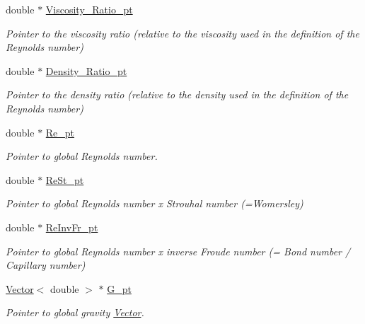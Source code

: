 \begin{DoxyCompactItemize}
\item 
double $\ast$ \hyperlink{classoomph_1_1GeneralisedNewtonianNavierStokesEquations_a14a357f03b102d42fc0e6eb7b539a504}{Viscosity\+\_\+\+Ratio\+\_\+pt}
\begin{DoxyCompactList}\small\item\em Pointer to the viscosity ratio (relative to the viscosity used in the definition of the Reynolds number) \end{DoxyCompactList}\item 
double $\ast$ \hyperlink{classoomph_1_1GeneralisedNewtonianNavierStokesEquations_a360d614813fbf4b87ad035226072b297}{Density\+\_\+\+Ratio\+\_\+pt}
\begin{DoxyCompactList}\small\item\em Pointer to the density ratio (relative to the density used in the definition of the Reynolds number) \end{DoxyCompactList}\item 
double $\ast$ \hyperlink{classoomph_1_1GeneralisedNewtonianNavierStokesEquations_adccaa796179b438e15eb40171b85cc90}{Re\+\_\+pt}
\begin{DoxyCompactList}\small\item\em Pointer to global Reynolds number. \end{DoxyCompactList}\item 
double $\ast$ \hyperlink{classoomph_1_1GeneralisedNewtonianNavierStokesEquations_ae15b0e84bf6ecee5b7503c090d8cbfcc}{Re\+St\+\_\+pt}
\begin{DoxyCompactList}\small\item\em Pointer to global Reynolds number x Strouhal number (=Womersley) \end{DoxyCompactList}\item 
double $\ast$ \hyperlink{classoomph_1_1GeneralisedNewtonianNavierStokesEquations_a0c012e6c9b566faa284ac9d321f5271d}{Re\+Inv\+Fr\+\_\+pt}
\begin{DoxyCompactList}\small\item\em Pointer to global Reynolds number x inverse Froude number (= Bond number / Capillary number) \end{DoxyCompactList}\item 
\hyperlink{classoomph_1_1Vector}{Vector}$<$ double $>$ $\ast$ \hyperlink{classoomph_1_1GeneralisedNewtonianNavierStokesEquations_aeca88320321b50470d839d15644140d9}{G\+\_\+pt}
\begin{DoxyCompactList}\small\item\em Pointer to global gravity \hyperlink{classoomph_1_1Vector}{Vector}. \end{DoxyCompactList}\item 

\end{DoxyCompactItemize}
